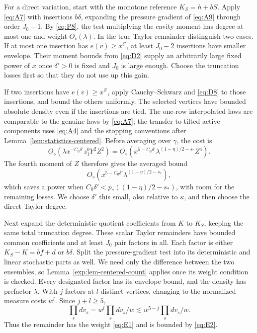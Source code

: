 For a direct variation, start with the monotone reference
\(K_S=h+bS\). Apply \eqref{eq:A7} with insertions \(b\delta\), expanding
the pressure gradient of \eqref{eq:A9} through order \(J_0-1\).
By \eqref{eq:P8}, the test multiplying the cavity moment has degree
at most one and weight \(O_\circ(\lambda)\). In the true Taylor
remainder distinguish two cases. If at most one insertion has
\(e(v)\ge x^{\delta'}\), at least \(J_0-2\) insertions have smaller
envelope. Their moment bounds from \eqref{eq:D2} supply an arbitrarily
large fixed power of \(x\) once \(\delta'>0\) is fixed and \(J_0\) is
large enough. Choose the truncation losses first so that they do not
use up this gain.

If two insertions have \(e(v)\ge x^{\delta'}\), apply Cauchy--Schwarz
and \eqref{eq:D8} to those insertions, and bound the others uniformly.
The selected vertices have bounded absolute density even if the
insertions are tied. The one-row interpolated laws are comparable to
the genuine laws by \eqref{eq:A7}; the transfer to tilted active
components uses \eqref{eq:A4} and the stopping conventions after
Lemma~\ref{lem:statistics-centered}. Before averaging over \(\gamma\),
the cost is
\[
 O_\diamond\!\left(\lambda x^{-C_0\delta'}z_1^0Y^2Z^2\right)
 =O_\diamond\!\left(
 x^{5-C_0\delta'}\lambda^{(1-\eta)/2-s_*}Z^4\right).
\]
The fourth moment of \(Z\) therefore gives the averaged bound
\[
 O_\diamond(x^{5-C_0\delta'}\lambda^{(1-\eta)/2-s_*}),
\]
which saves a power when
\(C_0\delta'<p_*((1-\eta)/2-s_*)\), with room for the remaining
losses. We choose \(\delta'\) this small, also relative to \(\kappa\),
and then choose the direct Taylor degree.

Next expand the deterministic quotient coefficients from \(K\) to
\(K_S\), keeping the same total truncation degree. These scalar Taylor
remainders have bounded common coefficients and at least \(J_0\) pair
factors in all. Each factor is either \(K_S-K=bf+d\) or \(b\delta\).
Split the pressure-gradient test into its deterministic and linear
stochastic parts as well. We need only the difference between the two
ensembles, so Lemma~\ref{exp:lem-centered-count} applies once its
weight condition is checked. Every designated factor has its envelope
bound, and the density has prefactor \(\lambda\). With \(j\) factors
at \(l\) distinct vertices, changing to the normalized measure costs
\(w^l\). Since \(j+l\ge5\),
\[
 \prod_s dv_s=w^l\prod_s dv_s/w
       \lesssim w^{5-j}\prod_s dv_s/w.
\]
Thus the remainder has the weight \eqref{eq:E1} and is bounded by
\eqref{eq:E2}.

